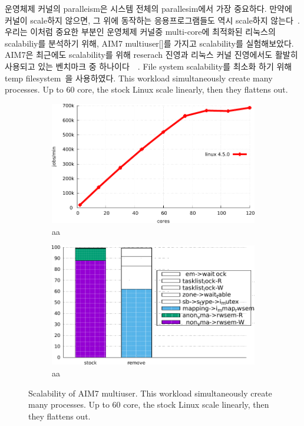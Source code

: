 운영체제 커널의 paralleism은 시스템 전체의 parallesim에서 가장 중요하다. 
만약에 커널이 scale하지 않으면, 그 위에 동작하는 응용프로그램들도 역시 scale하지 않는다~\cite{Clements15SCR}.
우리는 이처럼 중요한 부분인 운영체제 커널중 multi-core에 최적화된 리눅스의 scalabiliy를 분석하기 위해, AIM7
multiuser[]를 가지고 scalability를 실험해보았다.
AIM7은 최근에도 scalability를 위해 reserach 진영과 리눅스 커널 진영에서도 활발히 사용되고 있는 벤치마크 중
하나이다~\cite{Bueso2015STP}~\cite{Bueso2014MCS}.
File system scalability를 최소화 하기 위해 temp filesystem~\cite{Rohland2001Tempfs}을
사용하였다.
This workload simultaneously create many processes.
Up to 60 core, the stock Linux scale linearly, then they flattens out.

\else

\begin{figure}
  \begin{subfigure}[b]{0.23\textwidth}
    \includegraphics[width=\textwidth]{graph/aim7_default}
    \caption{aa}
  \end{subfigure}%
  \begin{subfigure}[b]{0.25\textwidth}
    \includegraphics[width=\textwidth]{graph/lockstat}
    \caption{aa}
  \end{subfigure}
  \centering
  \caption{Scalability of AIM7 multiuser. This workload simultaneously create
  many processes.
  Up to 60 core, the stock Linux scale linearly, then they flattens out.}
  \label{fig:aim7_default}
\end{figure}



